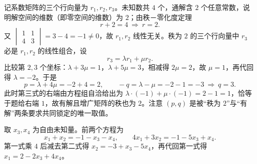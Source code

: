 
\begin{solution}
记系数矩阵的三个行向量为 $r_1,r_2,r_3$。未知数共 $4$ 个，通解含 $2$ 个任意常数，说明解空间的维数（即零空间的维数）为 $2$；由秩－零化度定理
\[
r+2=4\ \Longrightarrow\ r=2 .
\]
又 $\begin{vmatrix}1&1\\4&3\end{vmatrix}=3-4=-1\ne0$，故 $r_1,r_2$ 线性无关。秩为 $2$ 的三个行向量中 $r_3$ 必是 $r_1,r_2$ 的线性组合，设
\[
r_3=\lambda r_1+\mu r_2 .
\]
比较第 $2,3$ 个坐标：$\lambda+3\mu=1$，$\lambda+5\mu=3$，相减得 $2\mu=2$，故 $\mu=1$，再代回得 $\lambda=-2$。于是
\[
p=\lambda+4\mu=-2+4=2,\qquad -q=\lambda-\mu=-2-1=-3\ \Longrightarrow\ q=3 .
\]
此时第三式的右端由方程组自洽给出为 $\lambda\cdot(-1)+\mu\cdot(-1)=2-1=1$，恰等于题给右端 $1$，故有解且增广矩阵的秩也为 $2$。注意 $(p,q)$ 是被“秩为 $2$”与“有解”两条要求共同锁定的唯一取值。

取 $x_3,x_4$ 为自由未知量。前两个方程为
\[
x_1+x_2=-1-x_3-x_4,\qquad 4x_1+3x_2=-1-5x_3+x_4 .
\]
第一式乘 $4$ 后减去第二式得 $x_2=-3+x_3-5x_4$，再代回第一式得 $x_1=2-2x_3+4x_4$。
\end{solution}

